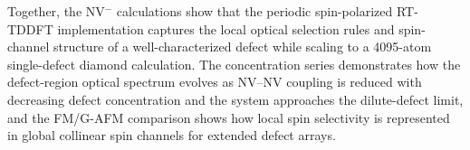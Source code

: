 Together, the NV$^{-}$ calculations show that the periodic
spin-polarized RT-TDDFT implementation captures the local optical
selection rules and spin-channel structure of a well-characterized
defect while scaling to a 4095-atom single-defect diamond calculation.
The concentration series demonstrates how the defect-region optical
spectrum evolves as NV--NV coupling is reduced with decreasing defect
concentration and the
system approaches the dilute-defect limit, and the FM/G-AFM comparison
shows how local spin selectivity is represented in global collinear
spin channels for extended defect arrays.
